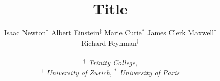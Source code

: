 \title{Title}

\ifdefined\DRAFT
 \pagestyle{fancyplain}
 \rhead{\thedate}
\fi


\author{
 Isaac Newton$^\dagger$\; 
 Albert Einstein$^\ddagger$\;
 Marie Curie$^\ast$\;
 James Clerk Maxwell$^\dagger$\;
\\
 Richard Feynman$^\dagger$\;
\\\\
 \emph{$^\dagger$  Trinity College}, \\
 \emph{$^\ddagger$ University of Zurich}, 
 \emph{$^\ast$ 	 University of Paris}
}

